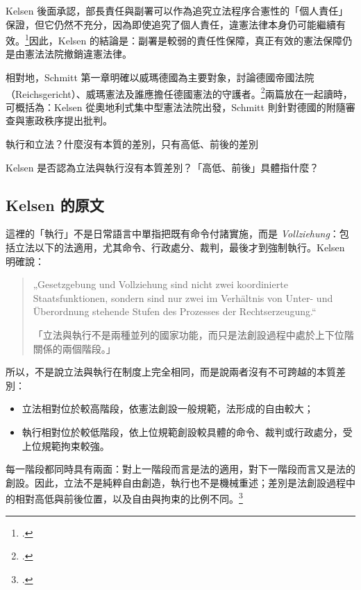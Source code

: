 Kelsen 後面承認，部長責任與副署可以作為追究立法程序合憲性的「個人責任」保證，但它仍然不充分，因為即使追究了個人責任，違憲法律本身仍可能繼續有效。\footcites[43--44]{kelsen2015}[60--61]{kelsen1929}因此，Kelsen 的結論是：副署是較弱的責任性保障，真正有效的憲法保障仍是由憲法法院撤銷違憲法律。

相對地，Schmitt 第一章明確以威瑪德國為主要對象，討論德國帝國法院（Reichsgericht）、威瑪憲法及誰應擔任德國憲法的守護者。\footcite[79--90]{schmitt2015}兩篇放在一起讀時，可概括為：Kelsen 從奧地利式集中型憲法法院出發，Schmitt 則針對德國的附隨審查與憲政秩序提出批判。


\begin{qaprompt}
執行和立法？什麼沒有本質的差別，只有高低、前後的差別
\end{qaprompt}

\begin{qaquestion}
Kelsen 是否認為立法與執行沒有本質差別？「高低、前後」具體指什麼？
\end{qaquestion}

\subsection{Kelsen 的原文}

這裡的「執行」不是日常語言中單指把既有命令付諸實施，而是 \emph{Vollziehung}：包括立法以下的法適用，尤其命令、行政處分、裁判，最後才到強制執行。Kelsen 明確說：

\begin{quote}
„Gesetzgebung und Vollziehung sind nicht zwei koordinierte Staatsfunktionen, sondern sind nur zwei im Verhältnis von Unter- und Überordnung stehende Stufen des Prozesses der Rechtserzeugung.``

「立法與執行不是兩種並列的國家功能，而只是法創設過程中處於上下位階關係的兩個階段。」
\end{quote}

所以，不是說立法與執行在制度上完全相同，而是說兩者沒有不可跨越的本質差別：

\begin{itemize}
\tightlist
\item
  立法相對位於較高階段，依憲法創設一般規範，法形成的自由較大；
\item
  執行相對位於較低階段，依上位規範創設較具體的命令、裁判或行政處分，受上位規範拘束較強。
\end{itemize}

每一階段都同時具有兩面：對上一階段而言是法的適用，對下一階段而言又是法的創設。因此，立法不是純粹自由創造，執行也不是機械重述；差別是法創設過程中的相對高低與前後位置，以及自由與拘束的比例不同。\footcites[22--24]{kelsen2015}[30--32]{kelsen1929}


